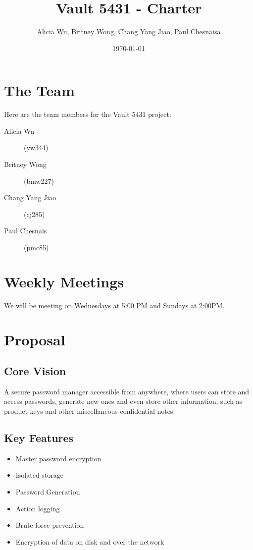 \documentclass{article}
\title{Vault 5431 - Charter}
\author{Alicia Wu, Britney Wong, Chang Yang Jiao, Paul Chesnaisa}
\date{\today}
\begin{document}
\maketitle
\thispagestyle{empty}

\section{The Team}
\label{sec:the_team}

Here are the team members for the Vault 5431 project:
\begin{description}
  \item[Alicia Wu] (yw344)
  \item[Britney Wong] (bmw227)
  \item[Chang Yang Jiao] (cj285)
  \item[Paul Chesnais] (pmc85)
\end{description}

\section{Weekly Meetings}
\label{sec:weekly_meetings}
We will be meeting on Wednesdays at 5:00 PM and Sundays at 2:00PM.

\section{Proposal}
\label{sec:proposal}

\subsection{Core Vision}
\label{sub:core_vision}

A secure password manager accessible from anywhere, where users can store and access passwords, generate new ones and even store other information, such as product keys and other miscellaneous confidential notes.

\subsection{Key Features}
\label{sub:key_features}
\begin{itemize}
  \item Master password encryption %
  \item Isolated storage %
  \item Password Generation
  \item Action logging %
  \item Brute force prevention %
  \item Encryption of data on disk and over the network %
\end{itemize}
\end{document}
